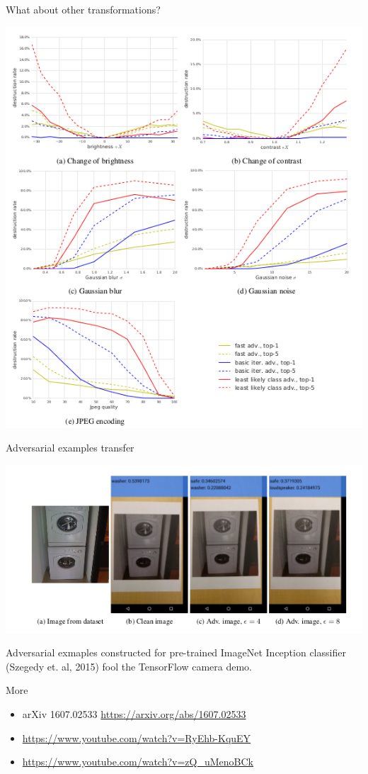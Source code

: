 \documentclass[15pt]{beamer}
\begin{document}
\begin{frame}{What about other transformations?}
  \begin{center}
  \includegraphics[width=0.55\linewidth]{other_transformations.png}
  \end{center}
\end{frame}


\begin{frame}{Adversarial examples transfer}
  \begin{center}
  \includegraphics[width=0.9\linewidth]{washer.png}
  \end{center}
  
  Adversarial exmaples constructed for pre-trained ImageNet Inception classifier (Szegedy et. al, 2015) fool the TensorFlow camera demo.
\end{frame}


\begin{frame}{More}
  \begin{itemize}
  \item arXiv 1607.02533 \url{https://arxiv.org/abs/1607.02533}
  \item 
  \begin{huge}
  \faYoutube
  \end{huge}
  \hspace{0.1in}
  \url{https://www.youtube.com/watch?v=RyEhb-KquEY}
  \item 
  \begin{huge}
  \faYoutube
  \end{huge}
  \hspace{0.1in}
  \url{  https://www.youtube.com/watch?v=zQ_uMenoBCk}
  \end{itemize}
\end{frame}
\end{document}
